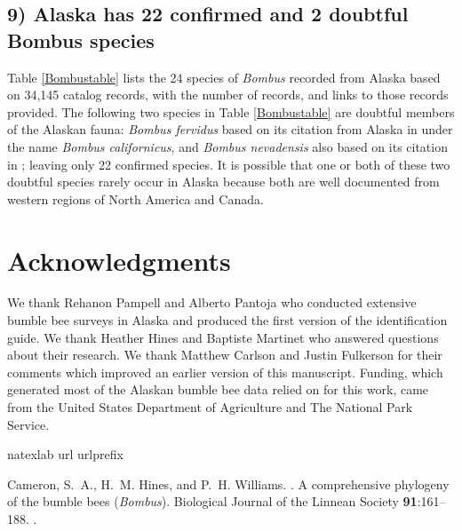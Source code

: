 \begin{multicols}{2}
\subsection{9) Alaska has 22 confirmed and 2 doubtful Bombus species} 

Table \ref{Bombustable} lists the 24 species of \textit{Bombus} recorded from Alaska based on 34,145  catalog records, with the number of records, and links to those records provided. The following two species in Table \ref{Bombustable} are doubtful members of the Alaskan fauna: \textit{Bombus fervidus} based on its citation from Alaska in \citet{Krombeinetal1979} under the name \textit{Bombus californicus}, and \textit{Bombus nevadensis} also based on its citation in \citet{Krombeinetal1979}; leaving only 22 confirmed species.  It is possible that one or both of these two doubtful species rarely occur in Alaska because both are well documented from western regions of North America and Canada.

\section{Acknowledgments}

We thank Rehanon Pampell and Alberto Pantoja who conducted extensive bumble bee surveys in Alaska and produced the first version of the identification guide. We thank Heather Hines and Baptiste Martinet who answered questions about their research. We thank Matthew Carlson and Justin Fulkerson for their comments which improved an earlier version of this manuscript. Funding, which generated most of the Alaskan bumble bee data relied on for this work, came from the United States Department of Agriculture and The National Park Service.

%

\begin{thebibliography}{24}
\expandafter\ifx\csname natexlab\endcsname\relax\def\natexlab#1{#1}\fi
\expandafter\ifx\csname url\endcsname\relax
  \def\url#1{{\tt #1}}\fi
\expandafter\ifx\csname urlprefix\endcsname\relax\def\urlprefix{{\small URL}
  }\fi

Cameron, S.~A., H.~M. Hines, and P.~H. Williams.
.
\newblock A comprehensive phylogeny of the bumble bees (\textit{Bombus}).
\newblock Biological Journal of the Linnean Society {\bfseries 91}:161--188.
\newblock {}.


\end{thebibliography}
\end{multicols}

